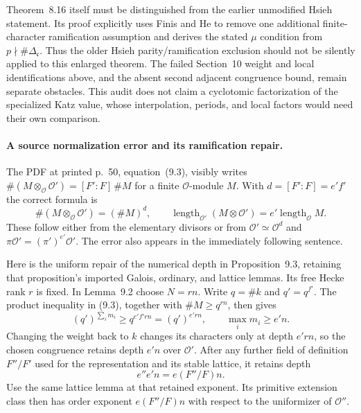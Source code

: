 Theorem~8.16 itself must be distinguished from the earlier unmodified
Hsieh statement.  Its proof explicitly uses Finis and He to remove
one additional finite-character ramification assumption and derives
the stated $\mu$ condition from $p\nmid\#\Delta_{\mathfrak c}$.
Thus the older Hsieh parity/ramification exclusion should not be
silently applied to this enlarged theorem.  The failed Section~10
weight and local identifications above, and the absent second
adjacent congruence bound, remain separate obstacles.  This audit
does not claim a cyclotomic factorization of the specialized Katz
value, whose interpolation, periods, and local factors would need
their own comparison.

\paragraph{A source normalization error and its ramification repair.}
The PDF at printed p.~50, equation~(9.3), visibly writes
$\#(M\otimes_{\mathcal O}\mathcal O')=[F':F]\,\#M$ for a
finite $\mathcal O$-module $M$.  With $d=[F':F]=e'f'$ the correct
formula is
\[
 \#(M\otimes_{\mathcal O}\mathcal O')=(\#M)^d,\qquad
 \operatorname{length}_{\mathcal O'}(M\otimes\mathcal O')
       =e'\operatorname{length}_{\mathcal O}M.                \tag{AF.10}
\]
These follow either from the elementary divisors or from
$\mathcal O'\simeq\mathcal O^d$ and
$\pi\mathcal O'=(\pi')^{e'}\mathcal O'$.
The error also appears in the immediately following sentence.

Here is the uniform repair of the numerical depth in Proposition~9.3,
retaining that proposition's imported Galois, ordinary, and lattice
lemmas.  Its free Hecke rank $r$ is fixed.  In Lemma~9.2 choose
$N=rn$.  Write $q=\#k$ and $q'=q^{f'}$.  The product inequality
in (9.3), together with $\#M\geq q^{rn}$, then gives
\[
 (q')^{\sum_i m_i}\geq q^{e'f'rn}
       =(q')^{e'rn},\qquad \max_i m_i\geq e'n.               \tag{AF.11}
\]
Changing the weight back to $k$ changes its characters only at depth
$e'rn$, so the chosen congruence retains depth $e'n$ over
$\mathcal O'$.  After any further field of definition $F''/F'$
used for the representation and its stable lattice, it retains depth
\[
 e''e'n=e(F''/F)n.                                          \tag{AF.12}
\]
Use the same lattice lemma at that retained exponent.  Its primitive
extension class then has order exponent $e(F''/F)n$ with respect to
the uniformizer of $\mathcal O''$.

